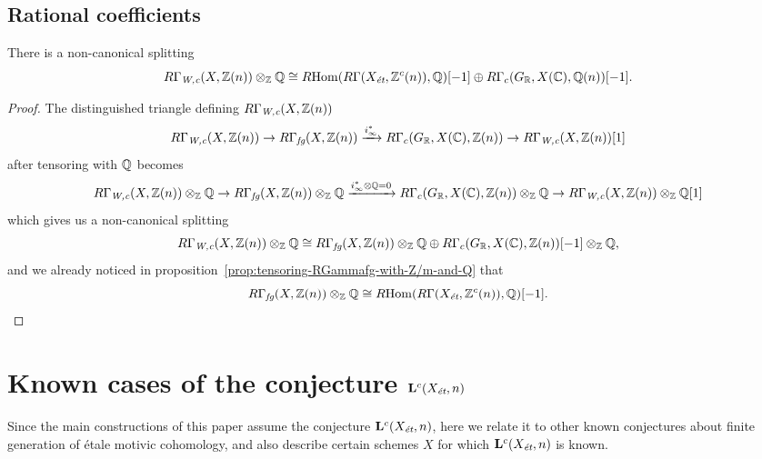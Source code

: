 \documentclass{article}
\numberwithin{equation}{section}
\begin{document}
\subsection*{Rational coefficients}

\begin{proposition}
  There is a non-canonical splitting
  \[ R\Gamma_\Wc (X, \ZZ(n)) \otimes_\ZZ \QQ \cong
    \RHom (R\Gamma (X_\et, \ZZ^c (n)), \QQ) [-1] \oplus
    R\Gamma_c (G_\RR, X (\CC), \QQ (n)) [-1]. \]

  \begin{proof}
    The distinguished triangle defining $R\Gamma_\Wc (X, \ZZ(n))$
    \[ R\Gamma_\Wc (X, \ZZ (n)) \to
      R\Gamma_\fg (X, \ZZ(n)) \xrightarrow{i_\infty^*}
      R\Gamma_c (G_\RR, X (\CC), \ZZ(n)) \to
      R\Gamma_\Wc (X, \ZZ (n)) [1] \]
    after tensoring with $\QQ$ becomes
    \[ R\Gamma_\Wc (X, \ZZ (n))\otimes_\ZZ \QQ \to
      R\Gamma_\fg (X, \ZZ(n))\otimes_\ZZ \QQ \xrightarrow{i_\infty^*\otimes\QQ = 0}
      R\Gamma_c (G_\RR, X (\CC), \ZZ(n))\otimes_\ZZ \QQ \to
      R\Gamma_\Wc (X, \ZZ (n))\otimes_\ZZ \QQ [1] \]
    which gives us a non-canonical splitting
    \cite[Chapitre~II, Corollaire~1.2.6]{Verdier-thesis}
    \[ R\Gamma_\Wc (X, \ZZ (n))\otimes_\ZZ \QQ \cong
      R\Gamma_\fg (X, \ZZ(n))\otimes_\ZZ \QQ \oplus
      R\Gamma_c (G_\RR, X (\CC), \ZZ(n)) [-1]\otimes_\ZZ \QQ, \]
    and we already noticed in
    proposition~\ref{prop:tensoring-RGammafg-with-Z/m-and-Q} that
    \[ R\Gamma_\fg (X, \ZZ (n)) \otimes_\ZZ \QQ \cong
      \RHom (R\Gamma (X_\et, \ZZ^c (n)), \QQ) [-1]. \qedhere \]
  \end{proof}
\end{proposition}


\section{Known cases of the conjecture \texorpdfstring{$\mathbf{L}^c (X_\et,n)$}{L\textasciicircum c (X\_ét, n)}}
\label{sec:known-cases-of-Lc-Xet-n}

Since the main constructions of this paper assume the conjecture
$\mathbf{L}^c (X_\et,n)$, here we relate it to other known conjectures about
finite generation of étale motivic cohomology, and also describe certain schemes
$X$ for which $\mathbf{L}^c (X_\et,n)$ is known.

\vspace{1em}
\end{document}
